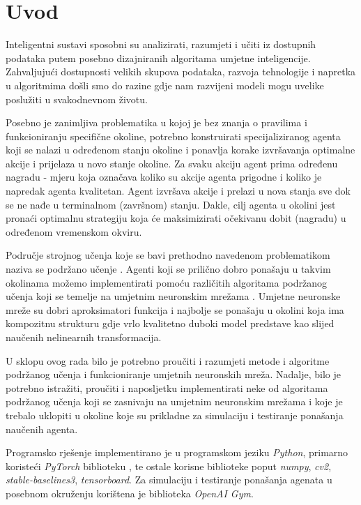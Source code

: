 \chapter{Uvod}
Inteligentni sustavi sposobni su analizirati, razumjeti i učiti iz dostupnih podataka putem posebno dizajniranih algoritama umjetne inteligencije. Zahvaljujući dostupnosti velikih skupova podataka, razvoja tehnologije i napretka u algoritmima došli smo do razine gdje nam razvijeni modeli mogu uvelike poslužiti u svakodnevnom životu.

Posebno je zanimljiva problematika u kojoj je bez znanja o pravilima i funkcioniranju specifične okoline, potrebno konstruirati specijaliziranog agenta koji se nalazi u određenom stanju okoline i ponavlja korake izvršavanja optimalne akcije i prijelaza u novo stanje okoline. Za svaku akciju agent prima određenu nagradu - mjeru koja označava koliko su akcije agenta prigodne i koliko je napredak agenta kvalitetan. Agent izvršava akcije i prelazi u nova stanja sve dok se ne nađe u terminalnom (završnom) stanju. Dakle, cilj agenta u okolini jest pronaći optimalnu strategiju koja će maksimizirati očekivanu dobit (nagradu) u određenom vremenskom okviru.

Područje strojnog učenja koje se bavi prethodno navedenom problematikom naziva se podržano učenje . Agenti koji se prilično dobro ponašaju u takvim okolinama možemo implementirati pomoću različitih algoritama podržanog učenja koji se temelje na umjetnim neuronskim mrežama . Umjetne neuronske mreže su dobri aproksimatori funkcija i najbolje se ponašaju u okolini koja ima kompozitnu strukturu gdje vrlo kvalitetno duboki model predstave kao slijed naučenih nelinearnih transformacija.

U sklopu ovog rada bilo je potrebno proučiti i razumjeti metode i algoritme podržanog učenja i funkcioniranje umjetnih neuronskih mreža. Nadalje, bilo je potrebno istražiti, proučiti i naposljetku implementirati neke od algoritama podržanog učenja koji se zasnivaju na umjetnim neuronskim mrežama i koje je trebalo uklopiti u okoline koje su prikladne za simulaciju i testiranje ponašanja naučenih agenta.

Programsko rješenje implementirano je u programskom jeziku \textit{Python}, primarno koristeći \textit{PyTorch} biblioteku , te ostale korisne biblioteke poput \textit{numpy}, \textit{cv2}, \textit{stable-baselines3}, \textit{tensorboard}. Za simulaciju i testiranje ponašanja agenata u posebnom okruženju korištena je biblioteka \textit{OpenAI Gym}. 
